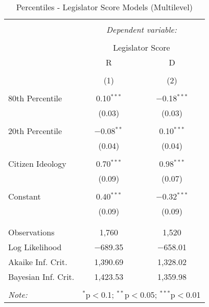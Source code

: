 
\begin{table}[!htbp] \centering 
  \caption{Percentiles - Legislator Score Models (Multilevel)} 
  \label{div.perc.mlm.models} 
\begin{tabular}{@{\extracolsep{5pt}}lcc} 
\\[-1.8ex]\hline 
\hline \\[-1.8ex] 
 & \multicolumn{2}{c}{\textit{Dependent variable:}} \\ 
\cline{2-3} 
\\[-1.8ex] & \multicolumn{2}{c}{Legislator Score} \\ 
 & R & D \\ 
\\[-1.8ex] & (1) & (2)\\ 
\hline \\[-1.8ex] 
 80th Percentile & 0.10$^{***}$ & $-$0.18$^{***}$ \\ 
  & (0.03) & (0.03) \\ 
  & & \\ 
 20th Percentile & $-$0.08$^{**}$ & 0.10$^{***}$ \\ 
  & (0.04) & (0.04) \\ 
  & & \\ 
 Citizen Ideology & 0.70$^{***}$ & 0.98$^{***}$ \\ 
  & (0.09) & (0.07) \\ 
  & & \\ 
 Constant & 0.40$^{***}$ & $-$0.32$^{***}$ \\ 
  & (0.09) & (0.09) \\ 
  & & \\ 
\hline \\[-1.8ex] 
Observations & 1,760 & 1,520 \\ 
Log Likelihood & $-$689.35 & $-$658.01 \\ 
Akaike Inf. Crit. & 1,390.69 & 1,328.02 \\ 
Bayesian Inf. Crit. & 1,423.53 & 1,359.98 \\ 
\hline 
\hline \\[-1.8ex] 
\textit{Note:}  & \multicolumn{2}{r}{$^{*}$p$<$0.1; $^{**}$p$<$0.05; $^{***}$p$<$0.01} \\ 
\end{tabular} 
\end{table} 
